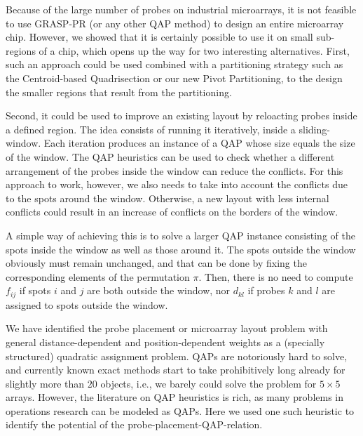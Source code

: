\documentclass[english]{lni}
\begin{document}
Because of the large number of probes on industrial microarrays, it is not
feasible to use GRASP-PR (or any other QAP method) to design an
entire microarray chip. However, we showed that it is certainly possible to use
it on small sub-regions of a chip, which opens up the way for two interesting
alternatives. First, such an approach could be used combined with a partitioning
strategy such as the Centroid-based Quadrisection or our new Pivot Partitioning,
to the design the smaller regions that result from the partitioning.

Second, it could be used to improve an existing layout by reloacting probes
inside a defined region. The idea consists of running it iteratively, inside a
sliding-window. Each iteration produces an instance of a QAP whose size equals
the size of the window. The QAP heuristics can be used to check whether
a different arrangement of the probes inside the window can reduce the conflicts.
For this approach to work, however, we also needs to take
into account the conflicts due to the spots around the window. Otherwise, a
new layout with less internal conflicts could result in an increase of conflicts
on the borders of the window.

A simple way of achieving this is to solve a larger QAP instance
consisting of the spots inside the window as well as those around it. The
spots outside the window obviously must remain unchanged, and that can be done
by fixing the corresponding elements of the permutation $\pi$. Then,
there is no need to compute $f_{ij}$ if spots $i$ and $j$ are both outside the
window, nor $d_{kl}$ if probes $k$ and $l$ are assigned to spots outside the
window.

We have identified the probe placement or microarray layout problem with
general distance-dependent and position-dependent weights as a (specially
structured) quadratic assignment problem. QAPs are notoriously hard to solve,
and currently known exact methods start to take prohibitively long already for
slightly more than $20$ objects, i.e., we barely could solve the problem for
$5\times 5$ arrays. However, the literature on QAP heuristics is rich,
as many problems in operations research can be modeled as QAPs. Here we used
one such heuristic to identify the potential of the
probe-placement-QAP-relation.
\end{document}
